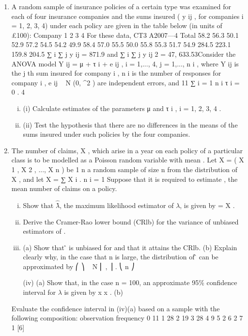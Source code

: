 \documentclass[a4paper,12pt]{article}
\begin{document}
\begin{enumerate}
\item A random sample of insurance policies of a certain type was examined for each of
four insurance companies and the sums insured ( y ij , for companies i = 1, 2, 3, 4)
under each policy are given in the table below (in units of £100):
Company
1
2
3
4
For these data,
CT3 A2007—4
Total
58.2
56.3
50.1
52.9
57.2
54.5
54.2
49.9
58.4
57.0
55.5
50.0
55.8
55.3
51.7
54.9
284.5
223.1
159.8
204.5
∑ i ∑ j y ij = 871.9 and ∑ i ∑ j y ij 2 = 47, 633.53Consider the ANOVA model Y ij = μ + τ i + e ij , i = 1,..., 4, j = 1,..., n i , where Y ij is the j th
sum insured for company i , n i is the number of responses for company i ,
e ij ~ N (0, \sigma^2 ) are independent errors, and
11
∑ i = 1 n i τ i = 0 .
4

\begin{enumerate}[(i)]
\item (i) Calculate estimates of the parameters μ and τ i , i = 1, 2, 3, 4 .
\item (ii) Test the hypothesis that there are no differences in the means of the sums
insured under such policies by the four companies.
\end{enumerate}


\item The number of claims, X , which arise in a year on each policy of a particular class is to be modelled as a Poisson random variable with mean \lambda. Let X = ( X 1 , X 2 , ..., X n ) be
1 n
a random sample of size n from the distribution of X , and let X = ∑ X i .
n i = 1
Suppose that it is required to estimate \lambda , the mean number of claims on a policy.
\begin{enumerate}[(i)]
\item Show that $\hat{\lambdâ}$, the maximum likelihood estimator of $\lambda$, is given by \hat{\lambda} = X . 
\item Derive the Cramer-Rao lower bound (CRlb) for the variance of unbiased estimators of \lambda.
\item 

(a) Show that \lambdâ is unbiased for \lambda and that it attains the CRlb.
(b) Explain clearly why, in the case that n is large, the distribution of \lambdâ can be approximated by
⎛ \lambda ⎞
\hat{\lambda} ~ N ⎜ \lambda , ⎟ .
⎝ n ⎠

(iv)
(a)
Show that, in the case n = 100, an approximate 95\% confidence interval for $\lambda$ is given by
x  x .
(b)
\end{enumerate}
Evaluate the confidence interval in (iv)(a) based on a sample with the
following composition:
observation
frequency
0
11
1
28
2
19
3
28
4
9
5
2
6
2
7
1
[6]



\end{enumerate}
\end{document}
